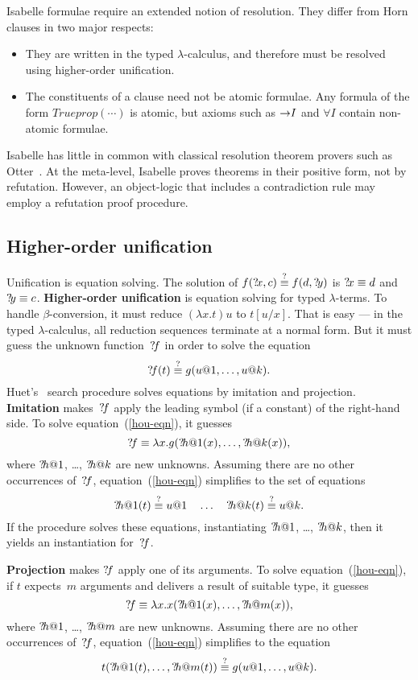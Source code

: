 Isabelle formulae require an extended notion of resolution.
They differ from Horn clauses in two major respects:
\begin{itemize}
    \item They are written in the typed $\lambda$-calculus, and therefore must be
    resolved using higher-order unification.

    \item The constituents of a clause need not be atomic formulae. Any
    formula of the form $Trueprop(\cdots)$ is atomic, but axioms such as
    ${\rightarrow}I$ and $\forall I$ contain non-atomic formulae.
\end{itemize}
Isabelle has little in common with classical resolution theorem provers
such as Otter~\cite{wos-bledsoe}. At the meta-level, Isabelle proves
theorems in their positive form, not by refutation. However, an
object-logic that includes a contradiction rule may employ a refutation
proof procedure.

\subsection{Higher-order unification}
Unification is equation solving. The solution of $f({?\!x},c) \stackrel{?}{\equiv}
f(d,{?\!y})$ is ${?\!x}\equiv d$ and ${?\!y}\equiv c$.  {\bf
Higher-order unification} is equation solving for typed $\lambda$-terms.
To handle $\beta$-conversion, it must reduce $(\lambda x.t)u$ to $t[u/x]$.
That is easy --- in the typed $\lambda$-calculus, all reduction sequences
terminate at a normal form. But it must guess the unknown
function~${?\!f}$ in order to solve the equation
\begin{equation}
    \label{hou-eqn}
    {?\!f}(t) \stackrel{?}{\equiv} g(u@1,\ldots,u@k).
\end{equation}
Huet's~\cite{huet75} search procedure solves equations by imitation and
projection.  {\bf Imitation} makes~${?\!f}$ apply the leading symbol (if a
constant) of the right-hand side. To solve equation~(\ref{hou-eqn}), it
guesses
\[ {?\!f} \equiv \lambda x. g({?\!h@1}(x),\ldots,{?\!h@k}(x)), \]
where ${?\!h@1}$, \ldots, ${?\!h@k}$ are new unknowns. Assuming there are no
other occurrences of~${?\!f}$, equation~(\ref{hou-eqn}) simplifies to the
set of equations
\[ {?\!h@1}(t)\stackrel{?}{\equiv} u@1 \quad\ldots\quad {?\!h@k}(t)\stackrel{?}{\equiv} u@k. \]
If the procedure solves these equations, instantiating ${?\!h@1}$, \ldots,
${?\!h@k}$, then it yields an instantiation for~${?\!f}$.

        {\bf Projection} makes ${?\!f}$ apply one of its arguments. To solve
equation~(\ref{hou-eqn}), if $t$ expects~$m$ arguments and delivers a
result of suitable type, it guesses
\[ {?\!f} \equiv \lambda x. x({?\!h@1}(x),\ldots,{?\!h@m}(x)), \]
where ${?\!h@1}$, \ldots, ${?\!h@m}$ are new unknowns. Assuming there are no
other occurrences of~${?\!f}$, equation~(\ref{hou-eqn}) simplifies to the
equation
\[ t({?\!h@1}(t),\ldots,{?\!h@m}(t)) \stackrel{?}{\equiv} g(u@1,\ldots,u@k). \]

